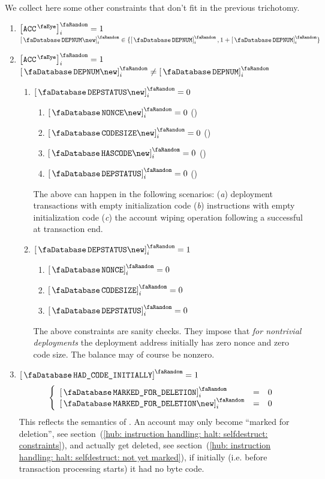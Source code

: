 We collect here some other constraints that don't fit in the previous trichotomy.
\begin{enumerate}
	\item
		\If $\order{\peekAccount} _{i} = 1$
		\Then $\order{\accDeploymentNumber \new }_{i} \in \{ \order{\accDeploymentNumber  }_{i}, 1 + \order{\accDeploymentNumber  }_{i} \}$
	\item
		\If $\order{\peekAccount} _{i} = 1$
		\et $\order{\accDeploymentNumber \new }_{i} \neq \order{\accDeploymentNumber  }_{i}$
		\begin{enumerate}
			\item
				\If $\order{\accDeploymentStatus \new }_{i} = 0$
				\Then
				\begin{enumerate}
					\item $\order{\accNonce        \new } _{i} = 0$ \quad (\trash)
					\item $\order{\accCodesize     \new } _{i} = 0$ \quad (\trash)
					\item $\order{\accHasCode      \new } _{i} = 0$ \quad (\trash)
					\item $\order{\accDeploymentStatus  } _{i} = 0$ \quad (\trash)
				\end{enumerate}
				\saNote{}
				The above can happen in the following scenarios:
				(\emph{a}) deployment transactions with empty initialization code
				(\emph{b})  instructions with empty initialization code
				(\emph{c}) the account wiping operation following a successful  at transaction end.
			\item
				\If $\order{\accDeploymentStatus \new }_{i} = 1$
				\Then
				\begin{enumerate}
					\item $\order{\accNonce             } _{i} = 0$
					\item $\order{\accCodesize          } _{i} = 0$
					\item $\order{\accDeploymentStatus  } _{i} = 0$
				\end{enumerate}
				\saNote{}
				The above constraints are sanity checks.
				They impose that \emph{for nontrivial deployments} the deployment address
				initially has zero nonce and zero code size.
				The balance may of course be nonzero.
		\end{enumerate}
	\item
		\If   $\order{\accHadCodeInitially} = 1$
		\Then
		\[
			\left\{ \begin{array}{lcl}
				\order{\accMarkedForDeletion     } _{i} & = & 0 \\
				\order{\accMarkedForDeletion \new} _{i} & = & 0 \\
			\end{array} \right.
		\]
		\saNote{}
		This reflects the  semantics of \cite{EIP-6780}.
		An account may only become ``marked for deletion'',
		see section~(\ref{hub: instruction handling: halt: selfdestruct: constraints}),
		and actually get deleted,
		see section~(\ref{hub: instruction handling: halt: selfdestruct: not yet marked}),
		if initially (i.e. before transaction processing starts) it had no byte code.
\end{enumerate}
